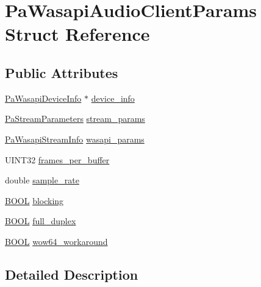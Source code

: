\hypertarget{struct_pa_wasapi_audio_client_params}{}\section{Pa\+Wasapi\+Audio\+Client\+Params Struct Reference}
\label{struct_pa_wasapi_audio_client_params}
\subsection*{Public Attributes}
\begin{DoxyCompactItemize}
\item 
\hyperlink{struct_pa_wasapi_device_info}{Pa\+Wasapi\+Device\+Info} $\ast$ \hyperlink{struct_pa_wasapi_audio_client_params_a733d080b96ac95e47f1e673447c041f2}{device\+\_\+info}
\item 
\hyperlink{struct_pa_stream_parameters}{Pa\+Stream\+Parameters} \hyperlink{struct_pa_wasapi_audio_client_params_ac01b82e3992a001815a26eeb5a225e8a}{stream\+\_\+params}
\item 
\hyperlink{struct_pa_wasapi_stream_info}{Pa\+Wasapi\+Stream\+Info} \hyperlink{struct_pa_wasapi_audio_client_params_a0b9dcf2124b754e948e50f44c2fe3638}{wasapi\+\_\+params}
\item 
U\+I\+N\+T32 \hyperlink{struct_pa_wasapi_audio_client_params_aa46fc2eb761fffa9ee34baf829b70e0e}{frames\+\_\+per\+\_\+buffer}
\item 
double \hyperlink{struct_pa_wasapi_audio_client_params_aaf327b0ecb554eb9d8b331d647c000b6}{sample\+\_\+rate}
\item 
\hyperlink{nfilterkit_8h_a3be13892ae7076009afcf121347dd319}{B\+O\+OL} \hyperlink{struct_pa_wasapi_audio_client_params_a1e3a0ed3228bb5fb0ff14f3207c8f2c4}{blocking}
\item 
\hyperlink{nfilterkit_8h_a3be13892ae7076009afcf121347dd319}{B\+O\+OL} \hyperlink{struct_pa_wasapi_audio_client_params_ac94ccf5cb33748fb1c5ad1f040ccc178}{full\+\_\+duplex}
\item 
\hyperlink{nfilterkit_8h_a3be13892ae7076009afcf121347dd319}{B\+O\+OL} \hyperlink{struct_pa_wasapi_audio_client_params_a0886e7cdcd3e6f7f989625d7f7493eb9}{wow64\+\_\+workaround}
\end{DoxyCompactItemize}


\subsection{Detailed Description}



